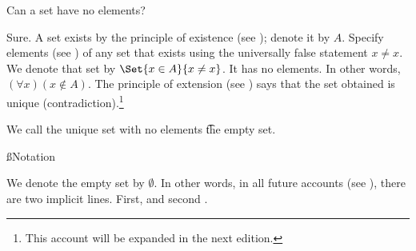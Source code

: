 

Can a set have no elements?


Sure.
A set exists by the principle of existence (see ); denote it by $A$.
Specify elements (see ) of any set that exists using the universally false statement $x \neq x$.
We denote that set by $\Set{x \in A}{x \neq x}$.
It has no elements.
In other words, $(\forall x)(x \not \in A)$.
The principle of extension (see ) says that the set obtained is unique (contradiction).\footnote{This account will be expanded in the next edition.}

\begin{definition}
	We call the unique set with no elements \t{the empty set}.
	\label{empty_set:definition}
\end{definition}



%
%

\ss{Notation}

We denote the empty set by $\emptyset$.
In other words, in all future accounts (see ), there are two implicit lines. First,  and second .

